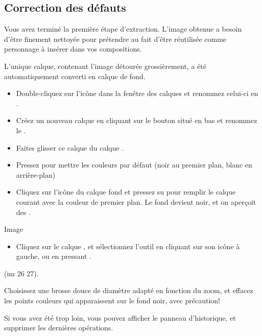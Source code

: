 \documentclass[a4paper,12pt,french]{sphinxmanual}
\begin{document}
\subsection{Correction des défauts}
\label{psd/detourage:correction-des-defauts}
Vous avez terminé la première étape d'extraction. L'image obtenue a besoin d'être finement nettoyée pour prétendre au fait d'être réutilisée comme personnage à insérer dans vos compositions.

L'unique calque, contenant l'image détourée grossièrement, a été automatiquement converti en calque de fond.
\begin{itemize}
\item {} 
Double-cliquez sur l'icône dans la fenêtre des calques et renommez celui-ci en .

\item {} 
Créez un nouveau calque en cliquant sur le bouton situé en bas et renommez le .

\item {} 
Faites glisser ce calque  du calque .

\item {} 
Pressez  pour mettre les couleurs par défaut (noir au premier plan, blanc en arrière-plan)

\item {} 
Cliquez sur l'icône du calque fond et pressez su  pour remplir le calque courant avec la couleur de premier plan. Le fond devient noir, et on aperçoit des .

\end{itemize}

Image
\begin{itemize}
\item {} 
Cliquez sur le calque , et sélectionnez l'outil  en cliquant sur son icône à gauche, ou en pressant .

\end{itemize}

(im 26 27).

Choisissez une brosse douce de diamètre adapté en fonction du zoom, et effacez les points couleurs qui apparaissent sur le fond noir, avec précaution!

Si vous avez été trop loin, vous pouvez afficher le panneau d'historique, et supprimer les dernières opérations.
\end{document}
